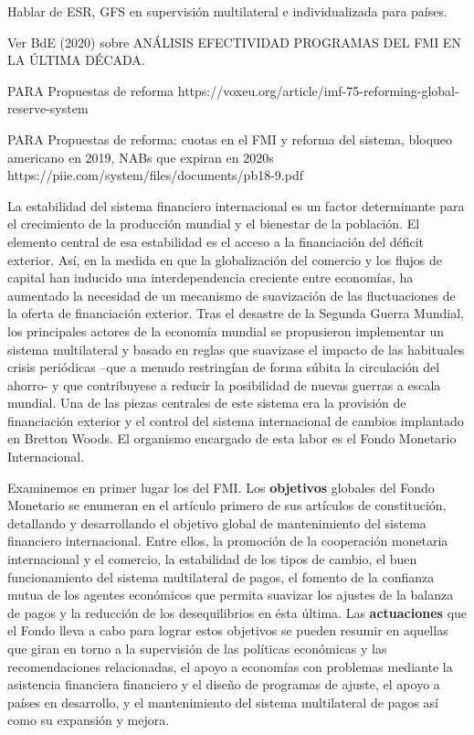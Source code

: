 \documentclass{nuevotema}
\begin{document}
\ideaclave

Hablar de ESR, GFS en supervisión multilateral e individualizada para países.

Ver BdE (2020) sobre ANÁLISIS EFECTIVIDAD PROGRAMAS DEL FMI EN LA ÚLTIMA DÉCADA.

PARA Propuestas de reforma
https://voxeu.org/article/imf-75-reforming-global-reserve-system

PARA Propuestas de reforma: cuotas en el FMI y reforma del sistema, bloqueo americano en 2019, NABs que expiran en 2020s  https://piie.com/system/files/documents/pb18-9.pdf 

La estabilidad del sistema financiero internacional es un factor determinante para el crecimiento de la producción mundial y el bienestar de la población. El elemento central de esa estabilidad es el acceso a la financiación del déficit exterior. Así, en la medida en que la globalización del comercio y los flujos de capital han inducido una interdependencia creciente entre economías, ha aumentado la necesidad de un mecanismo de suavización de las fluctuaciones de la oferta de financiación exterior. Tras el desastre de la Segunda Guerra Mundial, los principales actores de la economía mundial se propusieron implementar un sistema multilateral y basado en reglas que suavizase el impacto de las habituales crisis periódicas --que a menudo restringían de forma súbita la circulación del ahorro- y que contribuyese a reducir la posibilidad de nuevas guerras a escala mundial. Una de las piezas centrales de este sistema era la provisión de financiación exterior y el control del sistema internacional de cambios implantado en Bretton Woods. El organismo encargado de esta labor es el Fondo Monetario Internacional.

Examinemos en primer lugar los  del FMI. Los \textbf{objetivos} globales del Fondo Monetario se enumeran en el artículo primero de sus artículos de constitución, detallando y desarrollando el objetivo global de mantenimiento del sistema financiero internacional. Entre ellos, la promoción de la cooperación monetaria internacional y el comercio, la estabilidad de los tipos de cambio, el buen funcionamiento del sistema multilateral de pagos, el fomento de la confianza mutua de los agentes económicos que permita suavizar los ajustes de la balanza de pagos y la reducción de los desequilibrios en ésta última. Las \textbf{actuaciones} que el Fondo lleva a cabo para lograr estos objetivos se pueden resumir en aquellas que giran en torno a la supervisión de las políticas económicas y las recomendaciones relacionadas, el apoyo a economías con problemas mediante la asistencia financiera financiero y el diseño de programas de ajuste, el apoyo a países en desarrollo, y el mantenimiento del sistema multilateral de pagos así como su expansión y mejora. 
\end{document}

